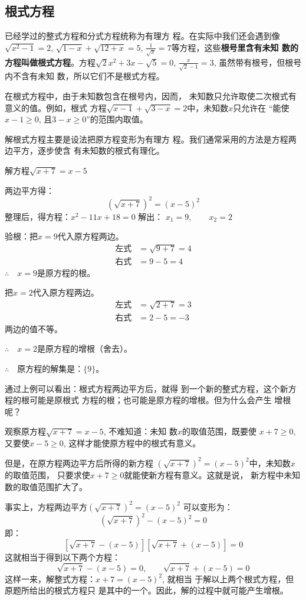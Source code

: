 \subsection{根式方程}
已经学过的整式方程和分式方程统称为有理方
程。在实际中我们还会遇到像$\sqrt{x^2-1}=2$, $\sqrt{1-x}+\sqrt{12+x}=5$,
$\frac{1}{\sqrt{x}}=7$等方程，这些\textbf{根号里含有未知
数的方程叫做根式方程}。方程$\sqrt{2}x^2+3x-\sqrt{5}=0$, 
$\frac{x}{\sqrt{2}-1}=3$, 虽然带有根号，但根号内不含有未知
数，所以它们不是根式方程。

在根式方程中，由于未知数包含在根号内，因而，
未知数只允许取使二次根式有意义的值。例如，根式
方程$\sqrt{x-1}+\sqrt{3-x}=2$中，未知数$x$只允许在
“能使$x-1\ge 0$, 且$3-x\ge 0$”的范围内取值。

解根式方程主要是设法把原方程变形为有理方
程。我们通常采用的方法是方程两边平方，逐步使含
有未知数的根式有理化。





\begin{example}
解方程$\sqrt{x+7}=x-5$
\end{example}

\begin{solution}
    两边平方得：
    \[(\sqrt{x+7})^2=(x-5)^2\]
    整理后，得方程：$x^2-11x+18=0$
    解出：
    $x_1=9,\qquad x_2=2$

    验根：把$x=9$代入原方程两边。
    \[\begin{split}
        \text{左式}&=\sqrt{9+7}=4\\
        \text{右式}&=9-5=4      
    \end{split}\]
$\therefore\quad x=9$是原方程的根。
    
把$x=2$代入原方程两边。
\[\begin{split}
    \text{左式}&=\sqrt{2+7}=3\\
    \text{右式}&=2-5=-3      
\end{split}\]
两边的值不等。

$\therefore\quad x=2$是原方程的增根（舍去）。

$\therefore\quad $原方程的解集是：$\{9\}$。

通过上例可以看出：根式方程两边平方后，就得
到一个新的整式方程，这个新方程的根可能是原根式
方程的根；也可能是原方程的增根。但为什么会产生
增根呢？

观察原方程$\sqrt{x+7}=x-5$, 不难知道：未知
数$x$的取值范围，既要使
$x+7\ge 0$, 又要使$x-5
\ge 0$, 这样才能使原方程中的根式有意义。

但是，在原方程两边平方后所得的新方程
$(\sqrt{x+7})^2=(x-5)^2$中，未知数$x$的取值范围，
只要求使$x+7\ge 0$就能使新方程有意义。这就是说，
新方程中未知数的取值范围扩大了。

事实上，方程两边平方$(\sqrt{x+7})^2=(x-5)^2$
可以变形为：
\[(\sqrt{x+7})^2-(x-5)^2=0\]
即：
\[\left[\sqrt{x+7}-(x-5)\right]\left[\sqrt{x+7}+(x-5)\right]=0 \]
这就相当于得到以下两个方程：
\[\sqrt{x+7}-(x-5)=0,\qquad \sqrt{x+7}+(x-5)=0\]
这样一来，解整式方程：$x+7=(x-5)^2$, 就相当
于解以上两个根式方程，但原题所给出的根式方程只
是其中的一个。因此，解的过程中就可能产生增根。
\end{solution}

